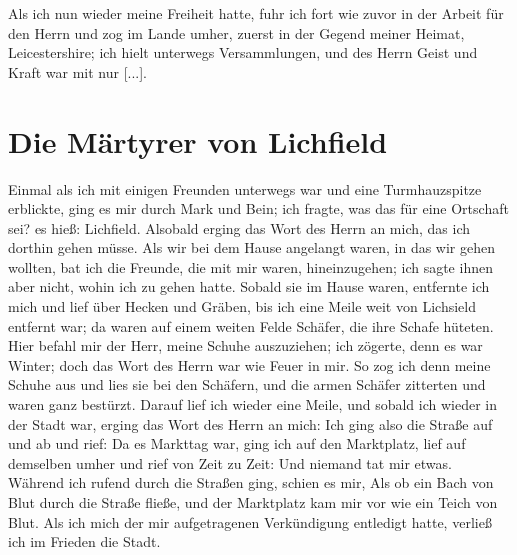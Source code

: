 Als ich nun wieder meine Freiheit hatte, fuhr ich fort wie
zuvor in der Arbeit für den Herrn und zog im Lande umher,
zuerst in der Gegend meiner Heimat, 
Leicestershire; ich hielt 
unterwegs Versammlungen, und des Herrn Geist und Kraft war mit
nur [...].

\section{Die Märtyrer von Lichfield}

Einmal als ich mit einigen Freunden unterwegs war und
eine Turmhauzspitze erblickte, ging es mir durch Mark und Bein;
ich fragte, was das für eine Ortschaft sei? es hieß: 
Lichfield.
Alsobald erging das Wort des Herrn an mich, das ich dorthin
gehen müsse. Als wir bei dem Hause angelangt waren, in das
wir gehen wollten, bat ich die Freunde, die mit mir waren, 
hineinzugehen; ich sagte ihnen aber nicht, wohin ich zu gehen hatte.
Sobald sie im Hause waren, entfernte ich mich und lief über
Hecken und Gräben, bis ich eine Meile weit von Lichsield 
entfernt war; da waren auf einem weiten Felde Schäfer, die ihre
Schafe hüteten. Hier befahl mir der Herr, meine Schuhe 
auszuziehen; ich zögerte, denn es war Winter; doch das Wort des
Herrn war wie Feuer in mir. So zog ich denn meine Schuhe
aus und lies sie bei den Schäfern, und die armen Schäfer zitterten
und waren ganz bestürzt. Darauf lief ich wieder eine Meile,
und sobald ich wieder in der Stadt war, erging das Wort des
Herrn an mich:  Ich
ging also die Straße auf und ab und rief:  Da es Markttag war, ging ich auf den 
Marktplatz, lief auf demselben umher und rief von Zeit 
zu Zeit:  
Und niemand tat mir etwas.
Während ich rufend durch die Straßen ging, schien es mir, Als
ob ein Bach von Blut durch die Straße fließe, und der 
Marktplatz kam mir vor wie ein Teich von Blut. Als ich mich der
mir aufgetragenen Verkündigung 
entledigt hatte, verließ ich im
Frieden die Stadt. 

